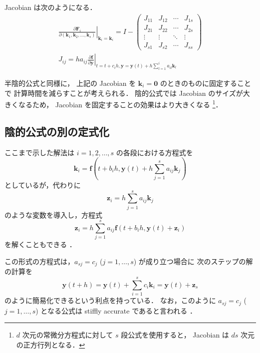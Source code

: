 Jacobian は次のようになる．
\begin{align}
    \left. \frac{\partial \bm{F}_i}{\partial (\bm{k}_1, \bm{k}_2, \ldots, \bm{k}_s)}
    \right|_{\bm{k}_i = \bm{k}_i}
    = I -
    \begin{pmatrix}
        J_{11} & J_{12} & \cdots & J_{1s} \\
        J_{21} & J_{22} & \cdots & J_{2s} \\
        \vdots & \vdots & \ddots & \vdots \\
        J_{s1} & J_{s2} & \cdots & J_{ss}
    \end{pmatrix}
    \\
    J_{ij} = h a_{ij} \left. \frac{\partial \bm{f}}{\partial \bm{y}}
    \right|_{t = t + c_i h, \bm{y} = \bm{y}(t) + h \sum_{l = 1}^i a_{il} \bm{k}_l}
\end{align}

半陰的公式と同様に，
上記の Jacobian を $\bm{k}_i = \bm{0}$ のときのものに固定することで
計算時間を減らすことが考えられる．
陰的公式では Jacobian のサイズが大きくなるため，
Jacobian を固定することの効果はより大きくなる
\footnote{$d$ 次元の常微分方程式に対して $s$ 段公式を使用すると，%
    Jacobian は $ds$ 次元の正方行列となる．}．

\subsection{陰的公式の別の定式化}\label{sec:ode_runge-kutta_another-implicit-stage-solving}

ここまで示した解法は $i = 1, 2, \ldots, s$ の各段における方程式を
\begin{equation}
    \bm{k}_i = \bm{f}\left(t + b_i h, \bm{y}(t) + h \sum_{j = 1}^s a_{ij} \bm{k}_j \right)
\end{equation}
としているが，代わりに
\begin{equation}
    \bm{z}_i = h \sum_{j = 1}^s a_{ij} \bm{k}_j
\end{equation}
のような変数を導入し，方程式
\begin{equation}
    \bm{z}_i = h \sum_{j = 1}^s a_{ij} \bm{f}\left(t + b_i h, \bm{y}(t) + \bm{z}_i \right)
\end{equation}
を解くこともできる \cite[Section IV.8.]{Hairer1991}．

この形式の方程式は，$a_{sj} = c_j$ ($j = 1, \ldots, s$) が成り立つ場合に
次のステップの解の計算を
\begin{equation}
    \bm{y}(t + h) = \bm{y}(t) + \sum_{i=1}^s c_i \bm{k}_i
    = \bm{y}(t) + \bm{z}_s
\end{equation}
のように簡易化できるという利点を持っている．
なお，このように $a_{sj} = c_j$ ($j = 1, \ldots, s$) となる公式は
stiffly accurate であると言われる
\cite[Section IV.6.]{Hairer1991}．
